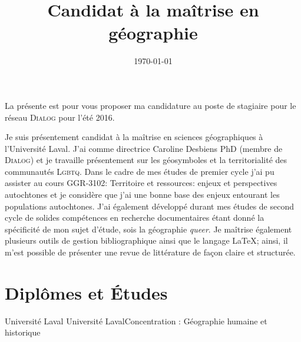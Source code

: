 \documentclass[10pt,letter]{moderncv}
\title{Candidat à la maîtrise en géographie}
\date{\today}
\begin{document}

{\fancyfoot[r]{}            %
  \setcounter{page}{0} %
  \makelettertitle %
  La présente est pour vous proposer ma candidature au poste de stagiaire pour
  le réseau \textsc{Dialog} pour l'été 2016.

Je suis présentement candidat à la maîtrise en sciences géographiques à
l'Université Laval. J'ai comme directrice Caroline Desbiens PhD (membre de
\textsc{Dialog}) et je travaille présentement sur les géosymboles et la
territorialité des communautés \textsc{Lgbtq}. Dans le cadre de mes études de
premier cycle j'ai pu assister au cours GGR-3102: Territoire et ressources:
enjeux et perspectives autochtones et je considère que j'ai une bonne base des
enjeux entourant les populations autochtones. J'ai également développé durant
mes études de second cycle de solides compétences en recherche documentaires
étant donné la spécificité de mon sujet d'étude, sois la géographie
\emph{queer}. Je maîtrise également plusieurs outils de gestion bibliographique
ainsi que le langage \LaTeX{}; ainsi, il m'est possible de présenter une revue
de littérature de façon claire et structurée.

\makeletterclosing          %
\newpage 
\maketitle

\section{Diplômes et Études}
 {Université Laval}{}{}{}
 {Université Laval}{}{}{Concentration : Géographie humaine et historique }

}
\end{document}

